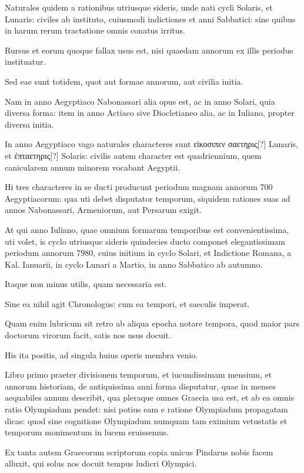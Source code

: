 \begin{parnumbers}
Naturales quidem a rationibus
utriusque sideris, unde nati cycli Solaris, et Lunaris: civiles
ab instituto, cuiusmodi indictiones et anni Sabbatici: sine quibus in
harum rerum tractatione omnis conatus irritus. 

Rursus et eorum
quoque fallax usus est, nisi quaedam annorum ex illis periodus instituatur.

Sed eae sunt totidem, quot aut formae annorum, aut civilia
initia.

Nam in anno Aegyptiaco Nabonassari alia opus est, ac in anno
Solari, quia diversa forma: item in anno Actiaco sive Diocletianeo
alia, ac in Iuliano, propter diversa initia.

In anno Aegyptiaco vago
naturales characteres sunt \textgreek{εἰκοσιπεν σαετηρις[?]} Lunaris, et
\textgreek{έπταετηρις[?]} Solaris:
civilis autem character est quadriennium, quem canicularem
annum minorem vocabant Aegyptii.

Hi tres characteres in se ducti
producunt periodum magnam annorum 700 Aegyptiacorum: qua
uti debet disputator temporum, siquidem rationes suas ad annos
Nabonassari, Armeniorum, aut Persarum exigit.

At qui anno Iuliano,
quae omnium formarum temporibus est convenientissima, uti
volet, is cyclo utriusque sideris quindecies ducto componet elegantissimam
periodum annorum 7980, cuius initium in cyclo Solari,
et Indictione Romana, a Kal. Ianuarii, in cyclo Lunari a Martio, in
anno Sabbatico ab autumno.

Itaque non minus utilis, quam necessaria
est.

Sine ea nihil agit Chronologus: cum ea tempori, et saeculis
imperat.

Quam enim lubricum sit retro ab aliqua epocha notare tempora,
quod maior pars doctorum virorum facit, satis nos usus docuit.

His ita positis, ad singula huius operis membra venio.

Libro primo
praeter divisionem temporum, et iucundissimam mensium, et
annorum historiam, de antiquissima anni forma disputatur, quae in
menses aequabiles annum describit, qua pleraque omnes Graecia usa
est, et ab ea omnis ratio Olympiadum pendet: nisi potius eam e ratione
Olympiadum propagatam dicas: quod sine cognitione Olympiadum
numquam tam eximium vetustatis et temporum monimentum
in lucem eruissemus. 

Ex tanta autem Graecorum scriptorum
copia unicus Pindarus nobis facem alluxit, qui solus nos docuit tempus
ludicri Olympici.


\end{parnumbers}
